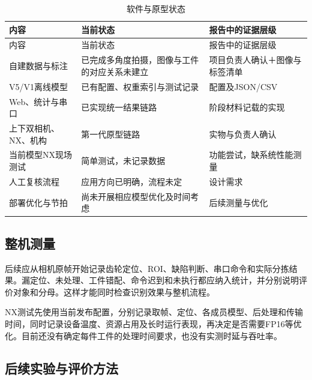 \begingroup\small{}
\begin{longtable}{@{}>{\raggedright\arraybackslash}p{0.240\dimexpr\linewidth-4\tabcolsep\relax}>{\raggedright\arraybackslash}p{0.340\dimexpr\linewidth-4\tabcolsep\relax}>{\raggedright\arraybackslash}p{0.420\dimexpr\linewidth-4\tabcolsep\relax}@{}}
\caption{软件与原型状态}\\
\toprule
内容 & 当前状态 & 报告中的证据层级 \\
\midrule\endfirsthead
\toprule
内容 & 当前状态 & 报告中的证据层级 \\
\midrule\endhead
\midrule\multicolumn{3}{r}{\footnotesize 续下页}\endfoot
\bottomrule\endlastfoot
自建数据与标注 & 已完成多角度拍摄，图像与工件的对应关系未建立 & 项目负责人确认＋图像与标签清单 \\
V5/V1离线模型 & 已有配置、权重索引与测试记录 & 配置及JSON/CSV \\
Web、统计与串口 & 已实现统一结果链路 & 阶段材料记载的实现 \\
上下双相机、NX、机构 & 第一代原型链路 & 实物与负责人确认 \\
当前模型NX现场测试 & 简单测试，未记录数据 & 功能尝试，缺系统性能测量 \\
人工复核流程 & 应用方向已明确，流程未定 & 设计需求 \\
部署优化与节拍 & 尚未开展相应模型优化及时间考虑 & 后续测量与优化 \\
\end{longtable}\endgroup

\FloatBarrier{}\subsection{整机测量}
后续应从相机原帧开始记录齿轮定位、ROI、缺陷判断、串口命令和实际分拣结果。漏定位、未处理、工件错配、命令迟到和未执行都应纳入统计，并分别说明评价对象和分母。这样才能同时检查识别效果与整机流程。

NX测试先使用当前发布配置，分别记录取帧、定位、各成员模型、后处理和传输时间，同时记录设备温度、资源占用及长时运行表现，再决定是否需要FP16等优化。目前还没有确定每件工件的处理时间要求，也没有实测时延与吞吐率。

\FloatBarrier{}\subsection{后续实验与评价方法}

